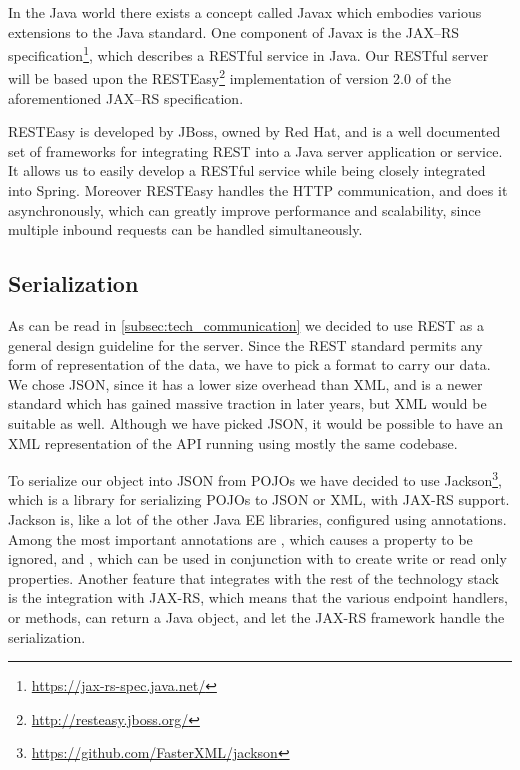 \bigskip
In the Java world there exists a concept called Javax which embodies various extensions to the Java standard.
One component of Javax is the JAX--RS specification\footnote{\url{https://jax-rs-spec.java.net/}}, which describes a RESTful service in Java.
Our RESTful server will be based upon the RESTEasy\footnote{\url{http://resteasy.jboss.org/}} implementation of version 2.0 of the aforementioned JAX--RS specification.

RESTEasy is developed by JBoss, owned by Red Hat, and is a well documented set of frameworks for integrating REST into a Java server application or service.
It allows us to easily develop a RESTful service while being closely integrated into Spring.
Moreover RESTEasy handles the HTTP communication, and does it asynchronously, which can greatly improve performance and scalability,
since multiple inbound requests can be handled simultaneously.

\subsection{Serialization}
As can be read in \cref{subsec:tech_communication} we decided to use REST as a general design guideline for the server.
Since the REST standard permits any form of representation of the data, we have to pick a format to carry our data.
We chose JSON, since it has a lower size overhead than XML, and is a newer standard which has gained massive traction in later years, but XML would be suitable as well.
Although we have picked JSON, it would be possible to have an XML representation of the API running using mostly the same codebase.

To serialize our object into JSON from \acp{POJO} we have decided to use Jackson\footnote{\url{https://github.com/FasterXML/jackson}}, which is a library for serializing \acp{POJO} to JSON or XML, with JAX-RS support.
Jackson is, like a lot of the other \ac{Java EE} libraries, configured using annotations.
Among the most important annotations are , which causes a property to be ignored, and , which can be used in conjunction with  to create write or read only properties.
Another feature that integrates with the rest of the technology stack is the integration with JAX-RS, which means that the various endpoint handlers, or methods, can return a Java object, and let the JAX-RS framework handle the serialization.

